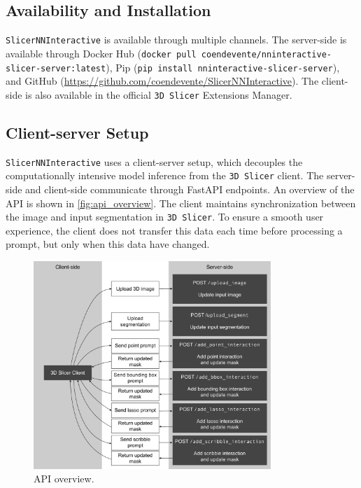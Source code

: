 \documentclass[
]{article}
\begin{document}
\subsection{Availability and
Installation}\label{availability-and-installation}

\texttt{SlicerNNInteractive} is available through multiple channels. The
server-side is available through Docker Hub
(\texttt{docker\ pull\ coendevente/nninteractive-slicer-server:latest}),
Pip (\texttt{pip\ install\ nninteractive-slicer-server}), and GitHub
(\url{https://github.com/coendevente/SlicerNNInteractive}). The
client-side is also available in the official \texttt{3D\ Slicer}
Extensions Manager.

\subsection{Client-server Setup}\label{client-server-setup}

\texttt{SlicerNNInteractive} uses a client-server setup, which decouples
the computationally intensive model inference from the
\texttt{3D\ Slicer} client. The server-side and client-side communicate
through FastAPI endpoints. An overview of the API is shown in
\autoref{fig:api_overview}. The client maintains synchronization between
the image and input segmentation in \texttt{3D\ Slicer}. To ensure a
smooth user experience, the client does not transfer this data each time
before processing a prompt, but only when this data have changed.

\begin{figure}
\centering
\includegraphics[width=0.8\textwidth,height=\textheight]{img/nni_api.pdf}
\caption{API overview.\label{fig:api_overview}}
\end{figure}
\end{document}
